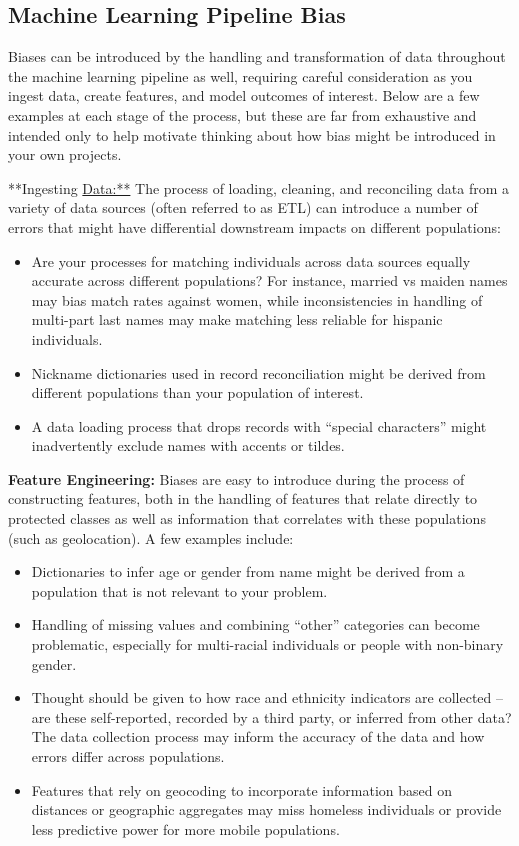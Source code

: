 \documentclass[]{krantz}
\begin{document}
\hypertarget{sec:mlbiasexamples}{\subsection{Machine Learning Pipeline
Bias}\label{sec:mlbiasexamples}}

Biases can be introduced by the handling and transformation of data
throughout the machine learning pipeline as well, requiring careful
consideration as you ingest data, create features, and model outcomes of
interest. Below are a few examples at each stage of the process, but
these are far from exhaustive and intended only to help motivate
thinking about how bias might be introduced in your own projects.

**Ingesting \url{Data:**} The process of loading, cleaning, and
reconciling data from a variety of data sources (often referred to as
ETL) can introduce a number of errors that might have differential
downstream impacts on different populations:

\begin{itemize}
\item
  Are your processes for matching individuals across data sources
  equally accurate across different populations? For instance, married
  vs maiden names may bias match rates against women, while
  inconsistencies in handling of multi-part last names may make matching
  less reliable for hispanic individuals.
\item
  Nickname dictionaries used in record reconciliation might be derived
  from different populations than your population of interest.
\item
  A data loading process that drops records with ``special characters''
  might inadvertently exclude names with accents or tildes.
\end{itemize}

\textbf{Feature Engineering:} Biases are easy to introduce during the
process of constructing features, both in the handling of features that
relate directly to protected classes as well as information that
correlates with these populations (such as geolocation). A few examples
include:

\begin{itemize}
\item
  Dictionaries to infer age or gender from name might be derived from a
  population that is not relevant to your problem.
\item
  Handling of missing values and combining ``other'' categories can
  become problematic, especially for multi-racial individuals or people
  with non-binary gender.
\item
  Thought should be given to how race and ethnicity indicators are
  collected -- are these self-reported, recorded by a third party, or
  inferred from other data? The data collection process may inform the
  accuracy of the data and how errors differ across populations.
\item
  Features that rely on geocoding to incorporate information based on
  distances or geographic aggregates may miss homeless individuals or
  provide less predictive power for more mobile populations.
\end{itemize}
\end{document}
